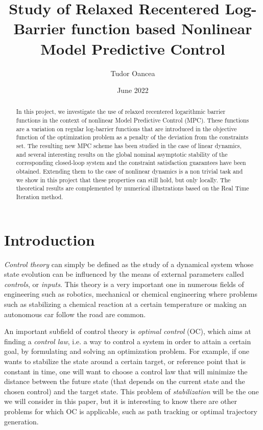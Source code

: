 \documentclass[12pt]{article}
\title{Study of Relaxed Recentered Log-Barrier function based Nonlinear Model Predictive Control}
\author{Tudor Oancea}
\date{June 2022}
\begin{document}
\maketitle

\begin{abstract}
	In this project, we investigate the use of relaxed recentered logarithmic barrier functions in the context of nonlinear Model Predictive Control (MPC).
	These functions are a variation on regular log-barrier functions that are introduced in the objective function of the optimization problem as a penalty of the deviation from the constraints set.
	The resulting new MPC scheme has been studied in the case of linear dynamics, and several interesting results on the global nominal asymptotic stability of the corresponding closed-loop system and the constraint satisfaction guarantees have been obtained.
	Extending them to the case of nonlinear dynamics is a non trivial task and we show in this project that these properties can still hold, but only locally.
	The theoretical results are complemented by numerical illustrations based on the Real Time Iteration method.
\end{abstract}

\section{Introduction}
\textit{Control theory} can simply be defined as the study of a dynamical system whose state evolution can be influenced by the means of external parameters called \textit{controls}, or \textit{inputs}.
This theory is a very important one in numerous fields of engineering such as robotics, mechanical or chemical engineering where problems such as stabilizing a chemical reaction at a certain temperature or making an autonomous car follow the road are common.

An important subfield of control theory is \textit{optimal control} (OC), which aims at finding a \textit{control law}, i.e. a way to control a system in order to attain a certain goal, by formulating and solving an optimization problem.
For example, if one wants to stabilize the state around a certain target, or reference point that is constant in time, one will want to choose a control law that will minimize the distance between the future state (that depends on the current state and the chosen control) and the target state.
This problem of \textit{stabilization} will be the one we will consider in this paper, but it is interesting to know there are other problems for which OC is applicable, such as path tracking or optimal trajectory generation.
\end{document}
